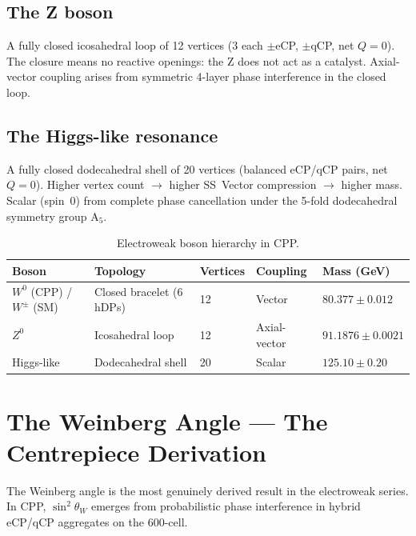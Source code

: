 \documentclass[11pt,letterpaper]{article}
\begin{document}
\subsection{The Z boson}

A fully closed icosahedral loop of 12 vertices (3 each $\pm$eCP,
$\pm$qCP, net $Q=0$).  The closure means no reactive openings: the Z
does not act as a catalyst.  Axial-vector coupling arises from
symmetric 4-layer phase interference in the closed loop.

\subsection{The Higgs-like resonance}

A fully closed dodecahedral shell of 20 vertices (balanced eCP/qCP
pairs, net $Q=0$).  Higher vertex count $\to$ higher SS~Vector
compression $\to$ higher mass.  Scalar (spin~0) from complete phase
cancellation under the 5-fold dodecahedral symmetry group A$_5$.

\begin{table}[H]
\centering
\caption{Electroweak boson hierarchy in CPP.}
\label{tab:hierarchy}
\begin{tabular}{@{}lllll@{}}
\toprule
Boson & Topology & Vertices & Coupling & Mass (GeV) \\
\midrule
$W^0$ (CPP) / $W^\pm$ (SM) & Closed bracelet (6 hDPs) & 12 & Vector & $80.377\pm0.012$ \\
$Z^0$ & Icosahedral loop & 12 & Axial-vector & $91.1876\pm0.0021$ \\
Higgs-like & Dodecahedral shell & 20 & Scalar & $125.10\pm0.20$ \\
\bottomrule
\end{tabular}
\end{table}

\section{The Weinberg Angle --- The Centrepiece Derivation}

The Weinberg angle is the most genuinely derived result in the
electroweak series.  In CPP, $\sin^2\theta_W$ emerges from
probabilistic phase interference in hybrid eCP/qCP aggregates on the
600-cell.
\end{document}
